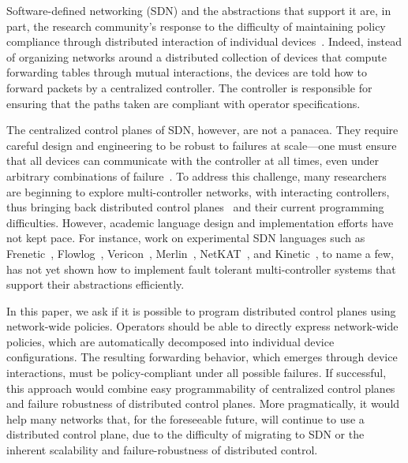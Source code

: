 Software-defined networking (SDN) and the abstractions
that support it are, in part, the research
community's response to the difficulty of maintaining policy
compliance through distributed interaction of individual
devices~\cite{sdn-languages}. Indeed, instead of organizing networks
around a distributed collection of devices that compute forwarding tables through
mutual interactions, the devices are told how to
forward packets by a centralized controller. The controller is responsible for ensuring that the
paths taken are compliant with operator specifications. 

The centralized control planes of SDN, however, are not a panacea.
%
They require careful design and engineering to be robust to failures at scale---one must ensure that all devices can communicate with the controller at all times, even under arbitrary combinations of failure~\cite{x,y,z}. To address this challenge, many researchers are beginning to explore 
multi-controller networks, with interacting controllers, thus bringing back distributed 
control planes~\cite{x,y,z} and their current programming difficulties.  However, academic
language design and implementation efforts have not kept pace.  For instance, work on
experimental SDN languages
such as Frenetic~\cite{frenetic}, Flowlog~\cite{flowlog}, Vericon~\cite{vericon}, Merlin~\cite{merlin}, NetKAT~\cite{netkat}, and Kinetic~\cite{kinetic}, to 
name a few, has not yet shown how to implement fault tolerant 
multi-controller systems that support their abstractions efficiently.

In this paper, we ask if it is possible to program distributed control planes using network-wide policies.
Operators should be able to directly express network-wide policies, which are automatically decomposed into individual device configurations. The resulting forwarding behavior, which emerges through device interactions, must be policy-compliant under all possible failures.
If successful, this approach would combine easy programmability of centralized control planes and failure robustness of distributed control planes.
%
More pragmatically, it would help many networks that, for the foreseeable future, will continue to use a distributed control plane, due to the difficulty of migrating to SDN or the inherent scalability and failure-robustness of distributed control.


